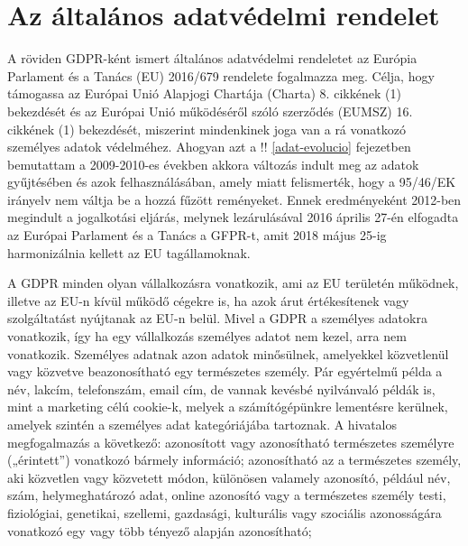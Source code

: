 \section{Az általános adatvédelmi rendelet}

A röviden GDPR-ként ismert általános adatvédelmi rendeletet az Európia Parlament és a Tanács (EU) 2016/679 rendelete fogalmazza meg. Célja, hogy támogassa az Európai Unió Alapjogi Chartája (Charta) 8. cikkének (1) bekezdését és az Európai Unió működéséről szóló szerződés (EUMSZ) 16. cikkének (1) bekezdését, miszerint mindenkinek joga van a rá vonatkozó személyes adatok védelméhez. Ahogyan azt a !! \ref{adat-evolucio} fejezetben bemutattam a 2009-2010-es években akkora változás indult meg az adatok gyűjtésében és azok felhasználásában, amely miatt felismerték, hogy a 95/46/EK irányelv \cite{95/46/EK} nem váltja be a hozzá fűzött reményeket. Ennek eredményeként 2012-ben megindult a jogalkotási eljárás, melynek lezárulásával 2016 április 27-én elfogadta az Európai Parlament és a Tanács a GFPR-t, amit 2018 május 25-ig harmonizálnia kellett az EU tagállamoknak.

A GDPR minden olyan vállalkozásra vonatkozik, ami az EU területén működnek, illetve az EU-n kívül működő cégekre is, ha azok árut értékesítenek vagy szolgáltatást nyújtanak az EU-n belül. Mivel a GDPR a személyes adatokra vonatkozik, így ha egy vállalkozás személyes adatot nem kezel, arra nem vonatkozik. Személyes adatnak azon adatok minősülnek, amelyekkel közvetlenül vagy közvetve beazonosítható egy természetes személy. Pár egyértelmű példa a név, lakcím, telefonszám, email cím, de vannak kevésbé nyilvánvaló példák is, mint a marketing célú cookie-k, melyek a számítógépünkre lementésre kerülnek, amelyek szintén a személyes adat kategóriájába tartoznak. A hivatalos megfogalmazás a következő: azonosított vagy azonosítható természetes személyre („érintett”) vonatkozó bármely információ; azonosítható az a természetes személy, aki közvetlen vagy közvetett módon, különösen valamely azonosító, például név, szám, helymeghatározó adat, online azonosító vagy a természetes személy testi, fiziológiai, genetikai, szellemi, gazdasági, kulturális vagy szociális azonosságára vonatkozó egy vagy több tényező alapján azonosítható;

